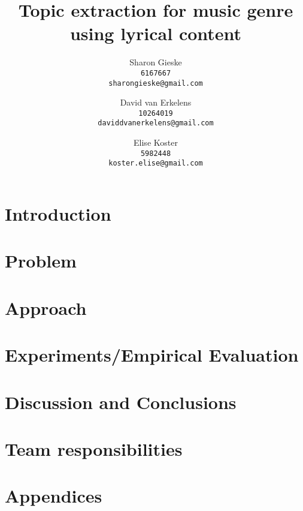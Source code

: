 \documentclass{article} %
\title{Topic extraction for music genre using lyrical content}
\author{
Sharon Gieske \\
\texttt{6167667}\\
\texttt{sharongieske@gmail.com} \\
\and
David van Erkelens\\
\texttt{10264019}\\
\texttt{daviddvanerkelens@gmail.com} \\
\and
Elise Koster \\
\texttt{5982448}\\
\texttt{koster.elise@gmail.com}
}
\begin{document}
\maketitle

\begin{abstract}

\end{abstract}
\clearpage
\section{Introduction}


\section{Problem}


\section{Approach}


\section{Experiments/Empirical Evaluation}


\section{Discussion and Conclusions}


\section{Team responsibilities}




\newpage
\section{Appendices}

\end{document}
